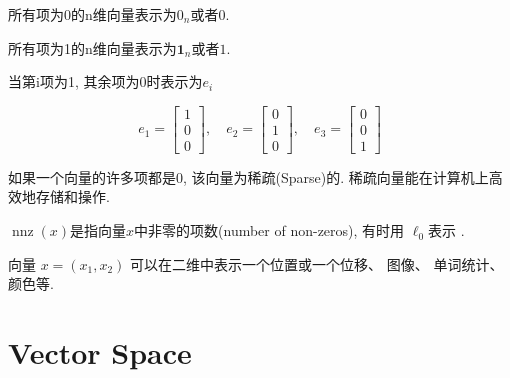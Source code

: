 \begin{definition}[零向量]
    所有项为0的n维向量表示为$0_n$或者$0$.
\end{definition}

\begin{definition}[全一向量]
      所有项为1的n维向量表示为$\boldsymbol{1}_n$或者$1$.
\end{definition}

\begin{definition}[单位向量]
    当第i项为1, 其余项为0时表示为$e_i$

    $$ {e}_{1}=\left[\begin{array}{l}1 \\ 0 \\ 0\end{array}\right], \quad e_{2}=\left[\begin{array}{l}0 \\ 1 \\ 0\end{array}\right], \quad e_{3}=\left[\begin{array}{l}0 \\ 0 \\ 1\end{array}\right] $$
\end{definition}

\begin{definition}[稀疏向量]
    如果一个向量的许多项都是0, 该向量为稀疏(Sparse)的. 稀疏向量能在计算机上高效地存储和操作. 

$\operatorname{nnz}(x)$是指向量$x$中非零的项数(number of non-zeros), 有时用 $\ell_0$表示 . 

\end{definition}

向量 \( x=\left(x_{1}, x_{2}\right) \) 可以在二维中表示一个位置或一个位移、 图像、 单词统计、颜色等. 

\section{Vector Space}

